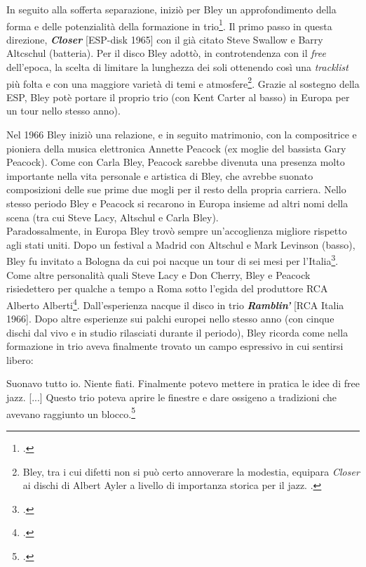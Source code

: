 In seguito alla sofferta separazione, iniziò per Bley un approfondimento della forma e delle potenzialità della formazione in trio\footcite[98]{stopping}. Il primo passo in questa direzione, \textit{\textbf{Closer}} [ESP-disk 1965] con il già citato Steve Swallow e Barry Altcschul (batteria). Per il disco Bley adottò, in controtendenza con il \textit{free} dell'epoca, la scelta di limitare la lunghezza dei soli ottenendo così una \textit{tracklist} più folta e con una maggiore varietà di temi e atmosfere\footnote{Bley, tra i cui difetti non si può certo annoverare la modestia, equipara \textit{Closer} ai dischi di Albert Ayler a livello di importanza storica per il jazz. \cite[100]{stopping}.}. Grazie al sostegno della ESP, Bley potè portare il proprio trio (con Kent Carter al basso) in Europa per un tour nello stesso anno).\par
Nel 1966 Bley iniziò una relazione, e in seguito matrimonio, con la compositrice e pioniera della musica elettronica Annette Peacock (ex moglie del bassista Gary Peacock). Come con Carla Bley, Peacock sarebbe divenuta una presenza molto importante nella vita personale e artistica di Bley, che avrebbe suonato composizioni delle sue prime due mogli per il resto della propria carriera. Nello stesso periodo Bley e Peacock si recarono in Europa insieme ad altri nomi della scena (tra cui Steve Lacy, Altschul e Carla Bley).\\
Paradossalmente, in Europa Bley trovò sempre un'accoglienza migliore rispetto agli stati uniti. Dopo un festival a Madrid con Altschul e Mark Levinson (basso), Bley fu invitato a Bologna da cui poi nacque un tour di sei mesi per l'Italia\footcite[102]{stopping}. Come altre personalità quali Steve Lacy e Don Cherry, Bley e Peacock risiedettero per qualche a tempo a Roma sotto l'egida del produttore RCA Alberto Alberti\footcite[104]{stopping}. Dall'esperienza nacque il disco in trio \textit{\textbf{Ramblin'}} [RCA Italia 1966]. Dopo altre esperienze sui palchi europei nello stesso anno (con cinque dischi dal vivo e in studio rilasciati durante il periodo), Bley ricorda come nella formazione in trio aveva finalmente trovato un campo espressivo in cui sentirsi libero:
\begin{fquote}
	Suonavo tutto io. Niente fiati. Finalmente potevo mettere in pratica le  idee di free jazz. [...] Questo trio poteva aprire le finestre e dare ossigeno a tradizioni che avevano raggiunto un blocco.\footcite[106]{stopping}
\end{fquote}
